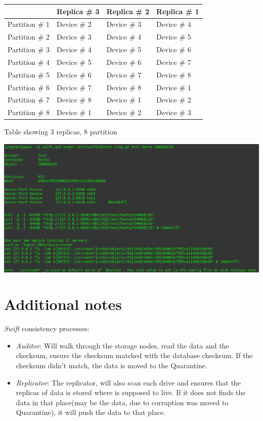 \documentclass{article}
\begin{document}
\begin{center}
\begin{tabular}{llll}
 & Replica \# 3 & Replica \# 2 & Replica \# 1\\
\hline
Partition \# 1 & Device \# 2 & Device \# 3 & Device \# 4\\
Partition \# 2 & Device \# 3 & Device \# 4 & Device \# 5\\
Partition \# 3 & Device \# 4 & Device \# 5 & Device \# 6\\
Partition \# 4 & Device \# 5 & Device \# 6 & Device \# 7\\
Partition \# 5 & Device \# 6 & Device \# 7 & Device \# 8\\
Partition \# 6 & Device \# 7 & Device \# 8 & Device \# 1\\
Partition \# 7 & Device \# 8 & Device \# 1 & Device \# 2\\
Partition \# 8 & Device \# 1 & Device \# 2 & Device \# 3\\
\end{tabular}
\end{center}


Table showing 3 replicas, 8 partition
\begin{center}
\includegraphics[width=.9\linewidth]{./img/swift-get-nodes.png}
\end{center}

\section{Additional notes}
\label{sec:orgc79afd6}
\emph{Swift} consistency processes:
\begin{itemize}
\item \emph{Auditor}: Will walk through the storage nodes, read the data and
the checksum, ensure the checksum matched with the database
checksum. If the checksum didn't match, the data is moved to the
Quarantine.
\item \emph{Replicator}: The replicator, will also scan each drive and
ensures that the replicas of data is stored where is supposed to
live. If it does not finds the data in that place(may be the
data, due to corruption was moved to Quarantine), it will push
the data to that place.
\end{itemize}
\end{document}
